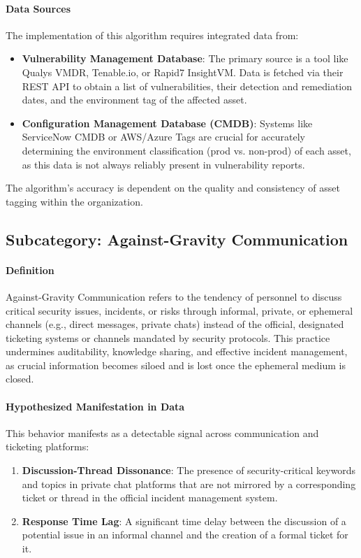 \documentclass[11pt, a4paper]{article}
\begin{document}
\paragraph{Data Sources} The implementation of this algorithm requires integrated data from:
\begin{itemize}
    \item \textbf{Vulnerability Management Database}: The primary source is a tool like Qualys VMDR, Tenable.io, or Rapid7 InsightVM. Data is fetched via their REST API to obtain a list of vulnerabilities, their detection and remediation dates, and the environment tag of the affected asset.
    \item \textbf{Configuration Management Database (CMDB)}: Systems like ServiceNow CMDB or AWS/Azure Tags are crucial for accurately determining the environment classification (prod vs. non-prod) of each asset, as this data is not always reliably present in vulnerability reports.
\end{itemize}
The algorithm's accuracy is dependent on the quality and consistency of asset tagging within the organization.

\subsection{Subcategory: Against-Gravity Communication}
\label{subsec:against_gravity_comm}

\paragraph{Definition} Against-Gravity Communication refers to the tendency of personnel to discuss critical security issues, incidents, or risks through informal, private, or ephemeral channels (e.g., direct messages, private chats) instead of the official, designated ticketing systems or channels mandated by security protocols. This practice undermines auditability, knowledge sharing, and effective incident management, as crucial information becomes siloed and is lost once the ephemeral medium is closed.

\paragraph{Hypothesized Manifestation in Data} This behavior manifests as a detectable signal across communication and ticketing platforms:
\begin{enumerate}
    \item \textbf{Discussion-Thread Dissonance}: The presence of security-critical keywords and topics in private chat platforms that are not mirrored by a corresponding ticket or thread in the official incident management system.
    \item \textbf{Response Time Lag}: A significant time delay between the discussion of a potential issue in an informal channel and the creation of a formal ticket for it.
\end{enumerate}
\end{document}
